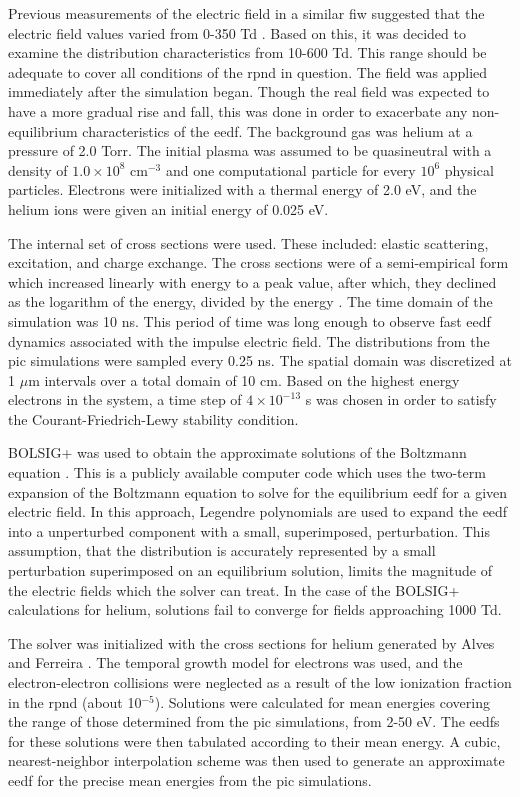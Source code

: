 Previous measurements of the electric field in a similar \acs{fiw} suggested
that the electric field values varied from 0-350 Td \cite{Takashima2011}. Based
on this, it was decided to examine the distribution characteristics from 10-600
Td. This range should be adequate to cover all conditions of the \acs{rpnd} in
question. The field was applied immediately after the simulation began. Though
the real field was expected to have a more gradual rise and fall, this was done
in order to exacerbate any non-equilibrium characteristics of the \acs{eedf}.
The background gas was helium at a pressure of 2.0 Torr. The initial plasma was
assumed to be quasineutral with a density of $1.0\times10^{8}$ cm$^{-3}$ and one
computational particle for every $10^6$ physical particles. Electrons were
initialized with a thermal energy of 2.0 eV, and the helium ions were given an
initial energy of 0.025 eV.

The internal set of cross sections were used. These included: elastic
scattering, excitation, and charge exchange. The cross sections were of a
semi-empirical form which increased linearly with energy to a peak value, after
which, they declined as the logarithm of the energy, divided by the energy
\cite{Verboncoeur1993}. The time domain of the simulation was 10 ns. This period
of time was long enough to observe fast \acs{eedf} dynamics associated with the
impulse electric field. The distributions from the \acs{pic} simulations were
sampled every 0.25 ns. The spatial domain was discretized at 1 $\mu$m intervals
over a total domain of 10 cm. Based on the highest energy electrons in the
system, a time step of $4\times10^{-13}$ s was chosen in order to satisfy the
Courant-Friedrich-Lewy stability condition.

BOLSIG+ was used to obtain the approximate solutions of the Boltzmann equation
\cite{Hagelaar2005}. This is a publicly available computer code which uses the
two-term expansion of the Boltzmann equation to solve for the equilibrium
\acs{eedf} for a given electric field. In this approach, Legendre polynomials
are used to expand the \acs{eedf} into a unperturbed component with a small,
superimposed, perturbation. This assumption, that the distribution is accurately
represented by a small perturbation superimposed on an equilibrium solution,
limits the magnitude of the electric fields which the solver can treat. In the
case of the BOLSIG+ calculations for helium, solutions fail to converge for
fields approaching 1000 Td.

The solver was initialized with the cross sections for helium generated by Alves
and Ferreira \cite{Alves2013}. The temporal growth model for electrons was used,
and the electron-electron collisions were neglected as a result of the low
ionization fraction in the \acs{rpnd} (about 10$^{-5}$). Solutions were
calculated for mean energies covering the range of those determined from the
\acs{pic} simulations, from 2-50 eV. The \acs{eedf}s for these solutions were
then tabulated according to their mean energy. A cubic, nearest-neighbor
interpolation scheme was then used to generate an approximate \acs{eedf} for the
precise mean energies from the \acs{pic} simulations.

